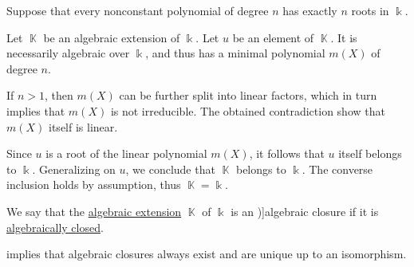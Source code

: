 \begin{defproof}
   Suppose that every nonconstant polynomial of degree \( n \) has exactly \( n \) roots in \( \Bbbk \).

  Let \( \BbbK \) be an algebraic extension of \( \Bbbk \). Let \( u \) be an element of \( \BbbK \). It is necessarily algebraic over \( \Bbbk \), and thus has a minimal polynomial \( m(X) \) of degree \( n \).

  If \( n > 1 \), then \( m(X) \) can be further split into linear factors, which in turn implies that \( m(X) \) is not irreducible. The obtained contradiction show that \( m(X) \) itself is linear.

  Since \( u \) is a root of the linear polynomial \( m(X) \), it follows that \( u \) itself belongs to \( \Bbbk \). Generalizing on \( u \), we conclude that \( \BbbK \) belongs to \( \Bbbk \). The converse inclusion holds by assumption, thus \( \BbbK = \Bbbk \).
\end{defproof}

\begin{definition}\label{def:algebraic_closure}
  We say that the \hyperref[def:algebraic_extension]{algebraic extension} \( \BbbK \) of \( \Bbbk \) is an \term[ru=алгебраическое замыкание (\cite[412]{Винберг2014Алгебра})]{algebraic closure} if it is \hyperref[def:algebraically_closed_field]{algebraically closed}.
\end{definition}
\begin{comments}
  \item {} implies that algebraic closures always exist and are unique up to an isomorphism.
\end{comments}

